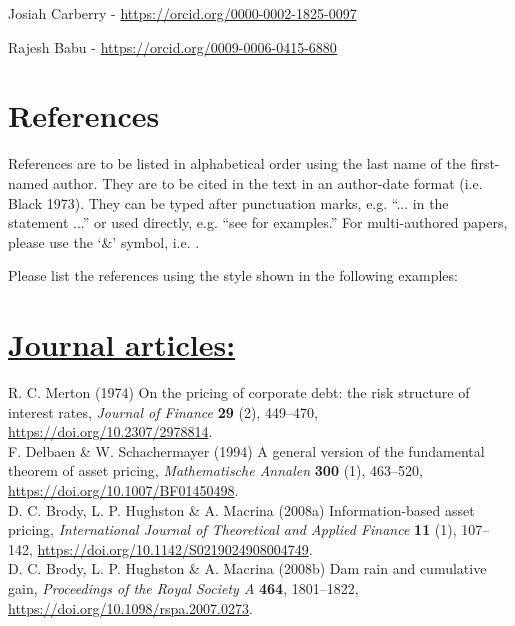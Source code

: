 \documentclass{ws-ijtaf}
\begin{document}
\noindent Josiah Carberry - \url{https://orcid.org/0000-0002-1825-0097}

\noindent Rajesh Babu - \url{https://orcid.org/0009-0006-0415-6880}

\section*{References}
References are to be listed in alphabetical order using the last name of the first-named author.
They are to be cited in the text in an author-date format (i.e. Black 1973).
They can be typed after punctuation marks, e.g. ``... in the statement \citep{duf01} ...''
or used directly, e.g. ``see \cite{duf01} for examples.''
For multi-authored papers, please use the `\&' symbol, i.e. \cite{del94}.

Please list the references using the style shown in the following examples:

\def\newsection#1{\section*{\underline{#1}}}

\newsection{Journal articles:}

\noindent R. C. Merton (1974) On the pricing of corporate debt: the risk structure of interest rates,
{\it Journal of Finance} {\bf 29} (2), 449--470, \url{https://doi.org/10.2307/2978814}.\\[2pt]

\noindent F. Delbaen \& W. Schachermayer (1994) A general version of the fundamental theorem of asset pricing, 
{\it Mathematische Annalen} {\bf 300} (1), 463--520, \url{https://doi.org/10.1007/BF01450498}.\\[2pt]

\noindent D. C. Brody, L. P. Hughston \& A. Macrina (2008a) Information-based asset pricing,
{\it International Journal of Theoretical and Applied Finance} {\bf 11} (1), 107--142, \url{https://doi.org/10.1142/S0219024908004749}.\\[2pt]

\noindent D. C. Brody, L. P. Hughston \& A. Macrina (2008b) Dam rain and cumulative gain,
{\it Proceedings of the Royal Society A} {\bf 464}, 1801--1822, \url{https://doi.org/10.1098/rspa.2007.0273}.

\enlargethispage*{13pt}
\end{document}
